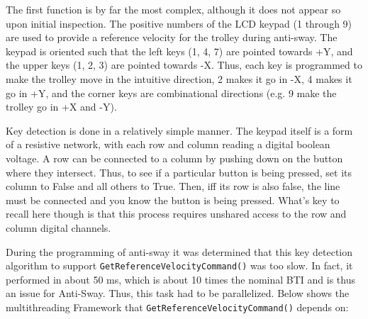 \documentclass[letterpaper]{article}
\begin{document}
The first function is by far the most complex, although it does not appear so upon initial inspection. The positive numbers of the LCD keypad (1 through 9) are used to provide a reference velocity for the trolley during anti-sway. The keypad is oriented such that the left keys (1, 4, 7) are pointed towards +Y, and the upper keys (1, 2, 3) are pointed towards -X. Thus, each key is programmed to make the trolley move in the intuitive direction, 2 makes it go in -X, 4 makes it go in +Y, and the corner keys are combinational directions (e.g. 9 make the trolley go in +X and -Y).

Key detection is done in a relatively simple manner. The keypad itself is a form of a resistive network, with each row and column reading a digital boolean voltage. A row can be connected to a column by pushing down on the button where they intersect. Thus, to see if a particular button is being pressed, set its column to False and all others to True. Then, iff its row is also false, the line must be connected and you know the button is being pressed. What's key to recall here though is that this process requires unshared access to the row and column digital channels.

During the programming of anti-sway it was determined that this key detection algorithm to support \texttt{GetReferenceVelocityCommand()} was too slow. In fact, it performed in about 50 ms, which is about 10 times the nominal BTI and is thus an issue for Anti-Sway. Thus, this task had to be parallelized. Below shows the multithreading Framework that \texttt{GetReferenceVelocityCommand()} depends on:
\end{document}
